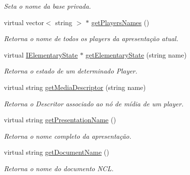 \begin{DoxyCompactItemize}
\begin{DoxyCompactList}\small\item\em Seta o nome da base privada. \item\end{DoxyCompactList}\item 
virtual vector$<$ string $>$ $\ast$ \hyperlink{classbr_1_1ufscar_1_1lince_1_1ginga_1_1wac_1_1state_1_1PresentationState_a82bc0879c2e2d6c6eb48ffaeee043bac}{getPlayersNames} ()
\begin{DoxyCompactList}\small\item\em Retorna o nome de todos os players da apresentação atual. \item\end{DoxyCompactList}\item 
virtual \hyperlink{classbr_1_1ufscar_1_1lince_1_1ginga_1_1wac_1_1state_1_1IElementaryState}{IElementaryState} $\ast$ \hyperlink{classbr_1_1ufscar_1_1lince_1_1ginga_1_1wac_1_1state_1_1PresentationState_a460f75f353ea3508dacdbd2a29bd537e}{getElementaryState} (string name)
\begin{DoxyCompactList}\small\item\em Retorna o estado de um determinado Player. \item\end{DoxyCompactList}\item 
virtual string \hyperlink{classbr_1_1ufscar_1_1lince_1_1ginga_1_1wac_1_1state_1_1PresentationState_a5f3306aca36ba9aac7c43d27f6f29ad9}{getMediaDescriptor} (string name)
\begin{DoxyCompactList}\small\item\em Retorna o Descritor associado ao nó de mídia de um player. \item\end{DoxyCompactList}\item 
virtual string \hyperlink{classbr_1_1ufscar_1_1lince_1_1ginga_1_1wac_1_1state_1_1PresentationState_af4149387468f9a7180c036f4fdce03bd}{getPresentationName} ()
\begin{DoxyCompactList}\small\item\em Retorna o nome completo da apresentação. \item\end{DoxyCompactList}\item 
virtual string \hyperlink{classbr_1_1ufscar_1_1lince_1_1ginga_1_1wac_1_1state_1_1PresentationState_a90a8797bdaffaed86c5a686652fea889}{getDocumentName} ()
\begin{DoxyCompactList}\small\item\em Retorna o nome do documento NCL. \item\end{DoxyCompactList}\item 

\end{DoxyCompactItemize}
